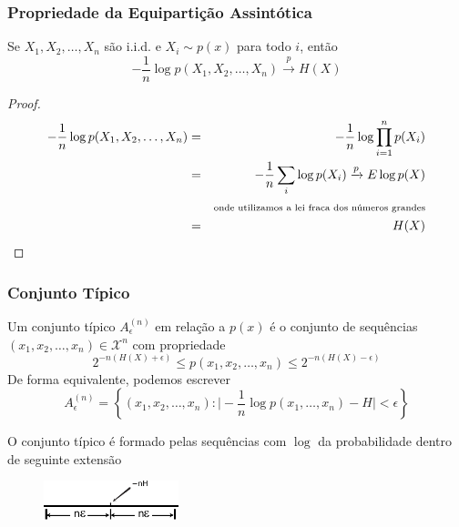 \begin{frame}%
  \frametitle{Propriedade da Equipartição Assintótica}
  \begin{theorem}\label{thm-prop-eqp-ass}
        Se $X_1, X_2, \ldots, X_n$ são i.i.d. e $X_i \sim p(x)$ para todo $i$, então
        \begin{equation}\label{eq-pX1X2Xn-H}
        -\frac{1}{n} \log p(X_1, X_2, \ldots, X_n) \xrightarrow{p} H(X)
        \end{equation}
  \end{theorem}

  \begin{proof}
  \vspace{-2ex}
  \begin{eqnarray}
  -\frac{1}{n} \log p(X_1, X_2, \ldots, X_n) &=& - \frac{1}{n} \log \prod_{i=1}^n p(X_i) \nonumber \\
                &=& - \frac{1}{n} \sum_i \log p(X_i) \xrightarrow{p} E \log p(X) \nonumber \\
                && \text{\scriptsize onde utilizamos a lei fraca dos números grandes} \nonumber \\
                &=& H(X)
  \end{eqnarray}
  \end{proof}
\end{frame}


\begin{frame}%
  \frametitle{Conjunto Típico}
  \begin{definition}
  Um conjunto típico $A_\epsilon^{(n)}$ em relação a $p(x)$ é o conjunto de sequências 
  $(x_1,x_2,\ldots,x_n) \in \mathcal{X}^n$ com propriedade
        \begin{equation}
        2^{-n(H(X)+\epsilon)} \leq p(x_1, x_2, \ldots, x_n) \leq 2^{-n(H(X)-\epsilon)}
        \end{equation}
  De forma equivalente, podemos escrever
        \begin{equation}
        A_\epsilon^{(n)} = \left\{ (x_1, x_2, \ldots, x_n) : \vert - \frac{1}{n} \log p(x_1, \ldots, x_n) - H \vert < \epsilon \right\}
        \end{equation}
  \end{definition}

  O conjunto típico é formado pelas sequências com $\log$ da probabilidade dentro
  de seguinte extensão 
  \begin{figure}[h!]
  \centering
  \includegraphics[width=0.35\textwidth]{images/range-ts.pdf}
  \label{fig:range-ts}
  \end{figure}
\end{frame}



